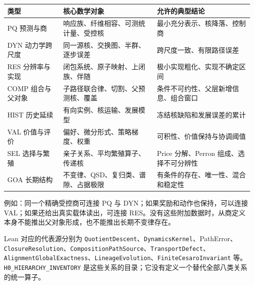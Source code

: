 \documentclass[
  11pt,
  oneside]{book}
\newcounter{none} %
\begin{document}
{\def\LTcaptype{none} %
\begin{longtable}[]{@{}
  >{\raggedright\arraybackslash}p{}
  >{\raggedright\arraybackslash}p{}
  >{\raggedright\arraybackslash}p{}@{}}
\toprule\noalign{}
\begin{minipage}[b]{\linewidth}\raggedright
类型
\end{minipage} & \begin{minipage}[b]{\linewidth}\raggedright
核心数学对象
\end{minipage} & \begin{minipage}[b]{\linewidth}\raggedright
允许的典型结论
\end{minipage} \\
\midrule\noalign{}
\endhead
\bottomrule\noalign{}
\endlastfoot
PQ 预测与商 & 响应族、纤维相容、可测统计量、受控核 & 最小充分表示、核降落、控制商 \\
DYN 动力学跨尺度 & 同一源核、交换图、半群、逐步误差 & 跨尺度一致、有限路径误差 \\
RES 分辨率与实现 & 闭包系统、原子映射、上闭族、伴随 & 极小实现粗化、实现不确定区间 \\
COMP 组合与父对象 & 子路径联合律、切割、父预测核、覆盖 & 条件不可约性、父层新增信息、组合窗口 \\
HIST 历史延续 & 有向实例、核运输、发展模型 & 冻结核缺陷和发展误差的累计 \\
VAL 价值与评价 & 偏好、微分形式、策略梯度、权重 & 可积性、价值保持与协调阈值 \\
SEL 选择与繁殖 & 亲子关系、平均繁殖算子、传递核 & Price 分解、Perron 组成、选择不可分辨性 \\
GOA 长期结构 & 不变律、QSD、复归类、谱隙、占据极限 & 有条件的存在、唯一性、混合和稳定性 \\
\end{longtable}
}

例如：同一个精确受控商可连接 PQ 与 DYN；如果奖励和动作也保持，可以连接 VAL；如果还给出真实载体读出，可连接 RES。没有这些附加数据时，从商定义本身不能推出父对象形成，也不能推出长期不变律存在。

Lean 对应的代表源分别为 \nolinkurl{QuotientDescent}、\nolinkurl{DynamicsKernel}、PathError、\nolinkurl{ClosureResolution}、\nolinkurl{CompositionPathSource}、\nolinkurl{TransportDefect}、\nolinkurl{AlignmentGlobalExactness}、\nolinkurl{LineageEvolution}、\nolinkurl{FiniteCesaroInvariant} 等。\nolinkurl{H0_HIERARCHY_INVENTORY} 是这些关系的目录；它没有定义一个替代全部八类关系的统一算子。
\end{document}
